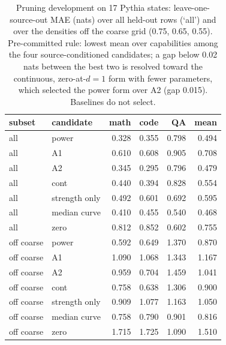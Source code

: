 \begin{table}[H]\centering\footnotesize
\begin{tabular}{@{}llrrrr@{}}
\toprule
subset & candidate & math & code & QA & mean \\
\midrule
all & power & 0.328 & 0.355 & 0.798 & 0.494 \\
all & A1 & 0.610 & 0.608 & 0.905 & 0.708 \\
all & A2 & 0.345 & 0.295 & 0.796 & 0.479 \\
all & cont & 0.440 & 0.394 & 0.828 & 0.554 \\
all & strength only & 0.492 & 0.601 & 0.692 & 0.595 \\
all & median curve & 0.410 & 0.455 & 0.540 & 0.468 \\
all & zero & 0.812 & 0.852 & 0.602 & 0.755 \\
off coarse & power & 0.592 & 0.649 & 1.370 & 0.870 \\
off coarse & A1 & 1.090 & 1.068 & 1.343 & 1.167 \\
off coarse & A2 & 0.959 & 0.704 & 1.459 & 1.041 \\
off coarse & cont & 0.758 & 0.638 & 1.306 & 0.900 \\
off coarse & strength only & 0.909 & 1.077 & 1.163 & 1.050 \\
off coarse & median curve & 0.758 & 0.790 & 0.901 & 0.816 \\
off coarse & zero & 1.715 & 1.725 & 1.090 & 1.510 \\
\bottomrule\end{tabular}
\caption{Pruning development on 17 Pythia states: leave-one-source-out MAE (nats) over all held-out rows (`all') and over the densities off the coarse grid (0.75, 0.65, 0.55). Pre-committed rule: lowest mean over capabilities among the four source-conditioned candidates; a gap below 0.02 nats between the best two is resolved toward the continuous, zero-at-$d{=}1$ form with fewer parameters, which selected the power form over A2 (gap 0.015). Baselines do not select.}
\label{tab:v53_loso}\end{table}
